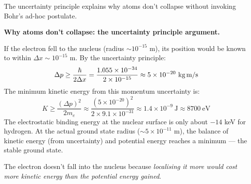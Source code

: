 \documentclass[12pt, a4paper]{book}
\begin{document}
\vspace{0.5em}

The uncertainty principle explains why atoms don't collapse
without invoking Bohr's ad-hoc postulate.

\begin{discoverybox}
\textbf{Why atoms don't collapse: the uncertainty principle argument.}

If the electron fell to the nucleus (radius $\sim 10^{-15}$ m),
its position would be known to within $\Delta x \sim 10^{-15}$ m.
By the uncertainty principle:
\[
  \Delta p \geq \frac{\hbar}{2\Delta x}
        = \frac{1.055\times10^{-34}}{2\times10^{-15}}
        \approx 5\times10^{-20}\ \text{kg\,m/s}
\]
The minimum kinetic energy from this momentum uncertainty is:
\[
  K \geq \frac{(\Delta p)^2}{2m_e}
        \approx \frac{(5\times10^{-20})^2}{2\times9.1\times10^{-31}}
        \approx 1.4\times10^{-9}\ \text{J} \approx 8700\ \text{eV}
\]
The electrostatic binding energy at the nuclear surface is only
about $-14$ keV for hydrogen.
At the actual ground state radius ($\sim 5\times10^{-11}$ m),
the balance of kinetic energy (from uncertainty) and potential energy
reaches a minimum --- the stable ground state.

The electron doesn't fall into the nucleus because
\emph{localising it more would cost more kinetic energy than
the potential energy gained}.
\end{discoverybox}
\end{document}
